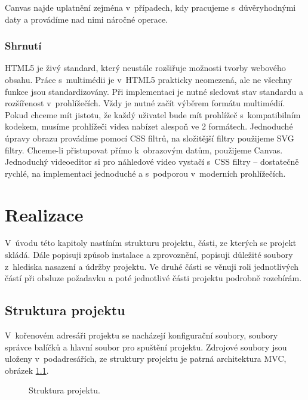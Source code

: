Canvas najde uplatnění zejména v~případech, kdy pracujeme s~důvěryhodnými daty a provádíme nad nimi náročné operace. 

\subsection{Shrnutí}
HTML5 je živý standard, který neustále rozšiřuje možnosti tvorby webového obsahu. Práce s~multimédii je v~HTML5 prakticky neomezená, ale ne všechny funkce jsou standardizovány. Při implementaci je nutné sledovat stav standardu a rozšířenost v~prohlížečích. Vždy je nutné začít výběrem formátu multimédií. Pokud chceme mít jistotu, že každý uživatel bude mít prohlížeč s~kompatibilním kodekem, musíme prohlížeči videa nabízet alespoň ve 2 formátech. Jednoduché úpravy obrazu provádíme pomocí CSS filtrů, na složitější filtry použijeme SVG filtry. Chceme-li přistupovat přímo k~obrazovým datům, použijeme Canvas. Jednoduchý videoeditor si pro náhledové video vystačí s~CSS filtry -- dostatečně rychlé, na implementaci jednoduché a s~podporou v~moderních prohlížečích.

\chapter{Realizace}
V~úvodu této kapitoly nastíním strukturu projektu, části, ze kterých se projekt skládá. Dále popisuji způsob instalace a zprovoznění, popisuji důležité soubory z~hlediska nasazení a údržby projektu. Ve druhé části se věnuji roli jednotlivých částí při obsluze požadavku a poté jednotlivé části projektu podrobně rozebírám.

\section{Struktura projektu}
V~kořenovém adresáři projektu se nacházejí konfigurační soubory, soubory správce balíčků a hlavní soubor pro spuštění projektu. Zdrojové soubory jsou uloženy v~podadresářích, ze struktury projektu je patrná architektura MVC, obrázek \ref{img:structure}.
\begin{figure}[h]
	\centering
	\caption{Struktura projektu.}\label{img:structure}
\end{figure}

